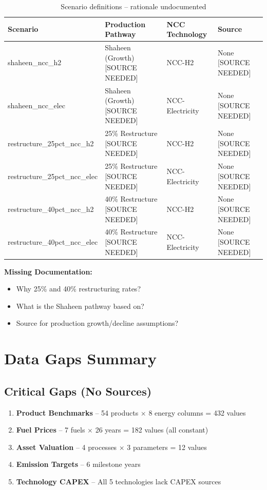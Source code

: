 \documentclass[12pt,a4paper]{article}
\newcommand{\nosource}[1]{\textcolor{sourcered}{#1 [SOURCE NEEDED]}}
\begin{document}
\begin{table}[H]
\centering
\begin{tabular}{llll}
\toprule
\textbf{Scenario} & \textbf{Production Pathway} & \textbf{NCC Technology} & \textbf{Source} \\
\midrule
shaheen\_ncc\_h2 & \nosource{Shaheen (Growth)} & NCC-H2 & \nosource{None} \\
shaheen\_ncc\_elec & \nosource{Shaheen (Growth)} & NCC-Electricity & \nosource{None} \\
restructure\_25pct\_ncc\_h2 & \nosource{25\% Restructure} & NCC-H2 & \nosource{None} \\
restructure\_25pct\_ncc\_elec & \nosource{25\% Restructure} & NCC-Electricity & \nosource{None} \\
restructure\_40pct\_ncc\_h2 & \nosource{40\% Restructure} & NCC-H2 & \nosource{None} \\
restructure\_40pct\_ncc\_elec & \nosource{40\% Restructure} & NCC-Electricity & \nosource{None} \\
\bottomrule
\end{tabular}
\caption{Scenario definitions -- rationale undocumented}
\end{table}

\textbf{Missing Documentation:}
\begin{itemize}
    \item Why 25\% and 40\% restructuring rates?
    \item What is the Shaheen pathway based on?
    \item Source for production growth/decline assumptions?
\end{itemize}

\section{Data Gaps Summary}
\label{sec:gaps}

\subsection{Critical Gaps (No Sources)}

\begin{enumerate}
    \item \textbf{Product Benchmarks} -- 54 products $\times$ 8 energy columns = 432 values
    \item \textbf{Fuel Prices} -- 7 fuels $\times$ 26 years = 182 values (all constant)
    \item \textbf{Asset Valuation} -- 4 processes $\times$ 3 parameters = 12 values
    \item \textbf{Emission Targets} -- 6 milestone years
    \item \textbf{Technology CAPEX} -- All 5 technologies lack CAPEX sources
\end{enumerate}
\end{document}
